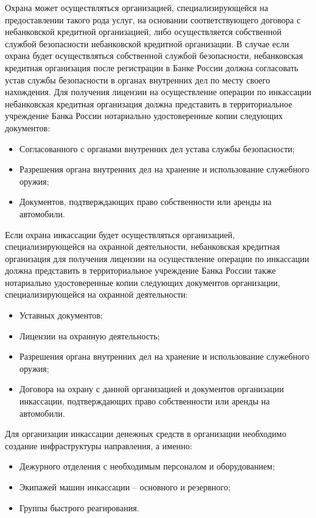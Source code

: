 \documentclass[a4paper,12pt,fleqn]{article} %
\begin{document}
Охрана  может осуществляться организацией,  специализирующейся   на   предоставлении такого рода услуг, на основании   соответствующего   договора  с небанковской кредитной организацией,  либо осуществляется  собственной службой безопасности небанковской кредитной организации. В случае если охрана будет осуществляться собственной службой безопасности, небанковская  кредитная  организация после регистрации в Банке России должна согласовать устав службы  безопасности  в  органах внутренних дел  по месту своего нахождения. Для получения лицензии на осуществление операции по  инкассации    небанковская кредитная организация должна  представить  в  территориальное  учреждение  Банка России нотариально удостоверенные копии следующих документов:  

\begin{itemize}
	\item Согласованного  с органами внутренних дел устава службы безопасности;  
	\item Разрешения органа внутренних дел  на  хранение  и   использование   служебного   оружия;
	\item Документов, подтверждающих   право   собственности   или   аренды   на  автомобили.
\end{itemize}

Если  охрана  инкассации  будет  осуществляться  организацией, специализирующейся на охранной  деятельности,  небанковская  кредитная организация для   получения  лицензии  на  осуществление  операции  по инкассации должна  представить  в  территориальное  учреждение   Банка России также нотариально   удостоверенные   копии   следующих документов  организации, специализирующейся на   охранной   деятельности:    

\begin{itemize}
	\item Уставных документов;    
	\item Лицензии    на    охранную деятельность; 
	\item Разрешения  органа  внутренних   дел   на   хранение   и использование служебного   оружия;   
	\item Договора   на   охрану  с  данной организацией и документов организации инкассации, подтверждающих право собственности или аренды на автомобили.
\end{itemize}

Для организации инкассации денежных средств в организации необходимо создание инфраструктуры направления, а именно: 

\begin{itemize}
	\item Дежурного отделения с необходимым персоналом и оборудованием; 
	\item Экипажей машин инкассации – основного и резервного; 
	\item Группы быстрого реагирования. 
\end{itemize}
\end{document}
